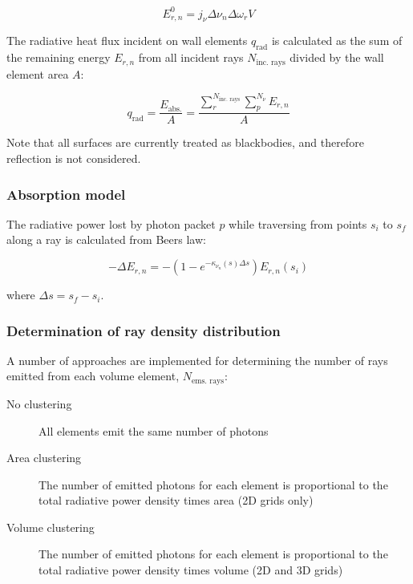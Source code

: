 \begin{equation}
 E_{r,n}^0 = j_{\nu} \Delta \nu_{n} \Delta \omega_{r} V
\end{equation}

The radiative heat flux incident on wall elements $q_\text{rad}$ is calculated as the sum of the remaining energy $E_{r,n}$ from all incident rays $N_\text{inc. rays}$ divided by the wall element area $A$:

\begin{equation}
 q_\text{rad} = \frac{ E_\text{abs.} }{A} =  \frac{ \displaystyle \sum_{r}^{N_{\text{inc. rays}}} \displaystyle \sum_{p}^{N_{\nu}} E_{r,n} }{ A }
 \label{eq:my_divq}
\end{equation}

\noindent Note that all surfaces are currently treated as blackbodies, and therefore reflection is not considered.

\subsubsection{Absorption model}

The radiative power lost by photon packet $p$ while traversing from points $s_{i}$ to $s_{f}$ along a ray is calculated from Beers law:

\begin{equation}
 - \Delta E_{r,n} = - ( 1 - e^{-\kappa_{\nu_{n}}(s) \Delta s } ) E_{r,n}(s_{i})
 \label{eq:E_rn}
\end{equation}

\noindent where $\Delta s = s_{f} - s_{i}$.

\subsubsection{Determination of ray density distribution}
\label{sec:ray_density_distribution}

A number of approaches are implemented for determining the number of rays emitted from each volume element, $N_{\text{ems. rays}}$:

\begin{description}
 \item[No clustering] All elements emit the same number of photons
 \item[Area clustering] The number of emitted photons for each element is proportional to the total radiative power density times area (2D grids only)
 \item[Volume clustering] The number of emitted photons for each element is proportional to the total radiative power density times volume (2D and 3D grids)
\end{description}

